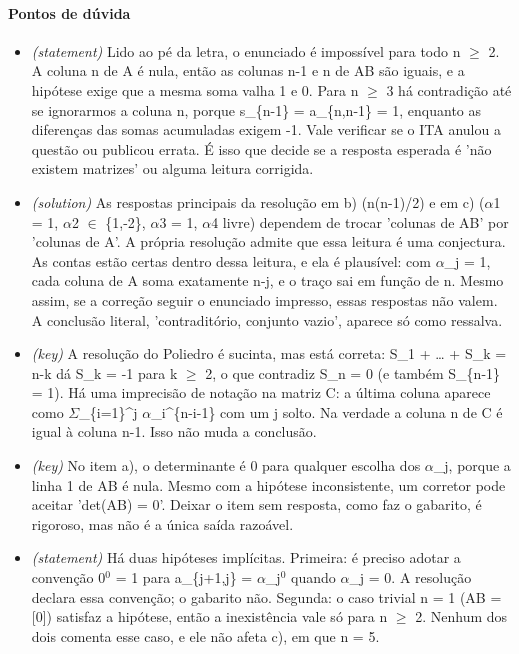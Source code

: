 \documentclass{article}%
\begin{document}
\paragraph{Pontos de dúvida}%
\begin{itemize}%
\item%
\textit{(statement)} Lido ao pé da letra, o enunciado é impossível para todo n $\geq$ 2. A coluna n de A é nula, então as colunas n-1 e n de AB são iguais, e a hipótese exige que a mesma soma valha 1 e 0. Para n $\geq$ 3 há contradição até se ignorarmos a coluna n, porque s\_\{n-1\} = a\_\{n,n-1\} = 1, enquanto as diferenças das somas acumuladas exigem -1. Vale verificar se o ITA anulou a questão ou publicou errata. É isso que decide se a resposta esperada é 'não existem matrizes' ou alguma leitura corrigida.%
\item%
\textit{(solution)} As respostas principais da resolução em b) (n(n-1)/2) e em c) ($\alpha$1 = 1, $\alpha$2 $\in$ \{1,-2\}, $\alpha$3 = 1, $\alpha$4 livre) dependem de trocar 'colunas de AB' por 'colunas de A'. A própria resolução admite que essa leitura é uma conjectura. As contas estão certas dentro dessa leitura, e ela é plausível: com $\alpha$\_j = 1, cada coluna de A soma exatamente n-j, e o traço sai em função de n. Mesmo assim, se a correção seguir o enunciado impresso, essas respostas não valem. A conclusão literal, 'contraditório, conjunto vazio', aparece só como ressalva.%
\item%
\textit{(key)} A resolução do Poliedro é sucinta, mas está correta: S\_1 + \ldots{} + S\_k = n-k dá S\_k = -1 para k $\geq$ 2, o que contradiz S\_n = 0 (e também S\_\{n-1\} = 1). Há uma imprecisão de notação na matriz C: a última coluna aparece como $\Sigma$\_\{i=1\}\^{}j $\alpha$\_i\^{}\{n-i-1\} com um j solto. Na verdade a coluna n de C é igual à coluna n-1. Isso não muda a conclusão.%
\item%
\textit{(key)} No item a), o determinante é 0 para qualquer escolha dos $\alpha$\_j, porque a linha 1 de AB é nula. Mesmo com a hipótese inconsistente, um corretor pode aceitar 'det(AB) = 0'. Deixar o item sem resposta, como faz o gabarito, é rigoroso, mas não é a única saída razoável.%
\item%
\textit{(statement)} Há duas hipóteses implícitas. Primeira: é preciso adotar a convenção 0$^{0}$ = 1 para a\_\{j+1,j\} = $\alpha$\_j$^{0}$ quando $\alpha$\_j = 0. A resolução declara essa convenção; o gabarito não. Segunda: o caso trivial n = 1 (AB = {[}0{]}) satisfaz a hipótese, então a inexistência vale só para n $\geq$ 2. Nenhum dos dois comenta esse caso, e ele não afeta c), em que n = 5.%
\end{itemize}%
\end{document}
